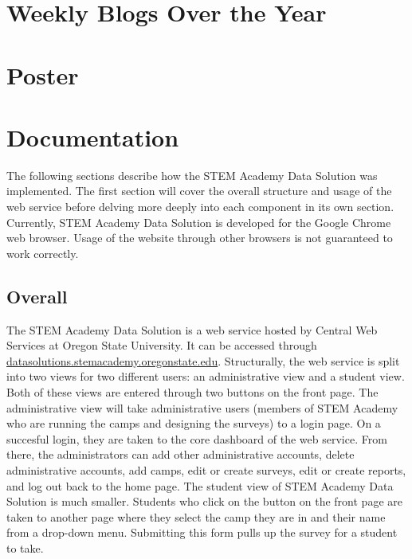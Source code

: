 \documentclass[letterpaper,10pt,serif,draftclsnofoot,onecolumn,compsoc,titlepage]{IEEEtran}
\begin{document}
\section{Weekly Blogs Over the Year}




\section{Poster}

\section{Documentation}
The following sections describe how the STEM Academy Data Solution was implemented.
The first section will cover the overall structure and usage of the web service before delving more deeply into each component in its own section.
Currently, STEM Academy Data Solution is developed for the Google Chrome web browser.
Usage of the website through other browsers is not guaranteed to work correctly.
\subsection{Overall}
The STEM Academy Data Solution is a web service hosted by Central Web Services at Oregon State University.
It can be accessed through \url{datasolutions.stemacademy.oregonstate.edu}.
Structurally, the web service is split into two views for two different users: an administrative view and a student view.
Both of these views are entered through two buttons on the front page.
The administrative view will take administrative users (members of STEM Academy who are running the camps and designing the surveys) to a login page.
On a succesful login, they are taken to the core dashboard of the web service.
From there, the administrators can add other administrative accounts, delete administrative accounts, add camps, edit or create surveys, edit or create reports, and log out back to the home page.
The student view of STEM Academy Data Solution is much smaller.
Students who click on the button on the front page are taken to another page where they select the camp they are in and their name from a drop-down menu.
Submitting this form pulls up the survey for a student to take.
\end{document}
